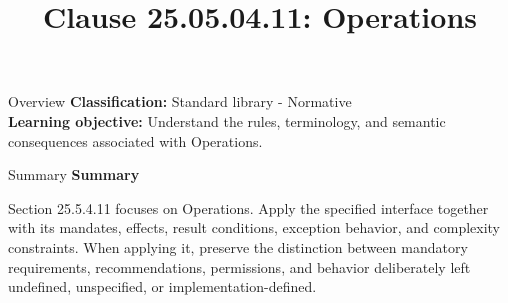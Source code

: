 \documentclass[10pt,letterpaper]{article}
\title{Clause 25.05.04.11: Operations}
\author{}
\date{}
\begin{document}
\maketitle
\begin{CornellOverviewBox}{Overview}
\textbf{Classification:} Standard library - Normative\\[2pt]
\textbf{Learning objective:} Understand the rules, terminology, and semantic consequences associated with Operations.
\end{CornellOverviewBox}\begin{CornellSummaryBox}{Summary}
{\sffamily\bfseries\color{Accent} Summary}\par\vspace{3pt}Section 25.5.4.11 focuses on Operations. Apply the specified interface together with its mandates, effects, result conditions, exception behavior, and complexity constraints. When applying it, preserve the distinction between mandatory requirements, recommendations, permissions, and behavior deliberately left undefined, unspecified, or implementation-defined.
\end{CornellSummaryBox}
\end{document}
